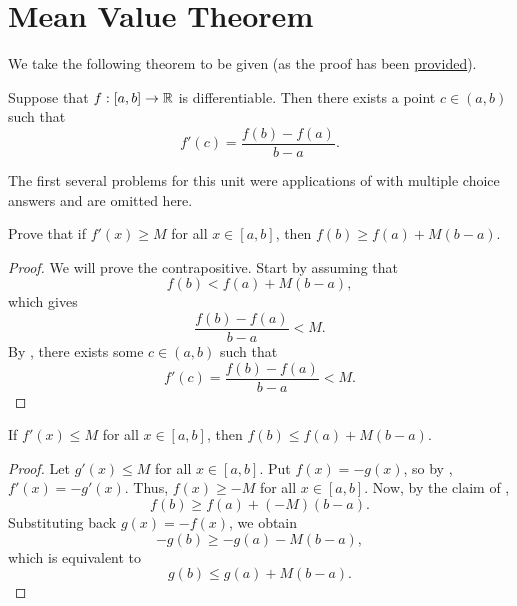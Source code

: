\section{Mean Value Theorem}

\begin{callout}
  We take the following theorem to be given (as the proof has been
  \href{https://www.youtube.com/watch?v=qtKZo1qOVlQ}{provided}).
  \begin{theorem}
  \label{thm:mean-value-theorem}
    Suppose that $f : [a, b] \to \mathbb{R}$ is differentiable. Then there exists a point $c \in (a, b)$ such that
    \[
      f'(c) = \frac{f(b) - f(a)}{b - a}.
    \]
  \end{theorem}
\end{callout}

\begin{callout}
  The first several problems for this unit were applications of
   with multiple choice answers and are omitted
  here.
\end{callout}

\begin{problem}
  \label{prob:lower-bounded-deriv-endpoints-not-on-secant-line}
  Prove that if $f'(x) \geq M$ for all $x \in [a, b]$, then $f(b) \geq f(a) + M(b - a)$.

  \begin{proof}
    We will prove the contrapositive. Start by assuming that
    \[
      f(b) < f(a) + M(b - a),
    \]
    which gives
    \[
      \frac{f(b) - f(a)}{b - a} < M.
    \]
    By , there exists some $c \in (a, b)$ such that
    \[
      f'(c) = \frac{f(b) - f(a)}{b - a} < M.
    \]
  \end{proof}

  \begin{corollary}
    \label{cor:upper-bounded-deriv-endpoints-not-on-secant-line}
    If $f'(x) \leq M$ for all $x \in [a, b]$, then $f(b) \leq f(a) + M(b - a)$.
  \end{corollary}

  \begin{proof}
    Let $g'(x) \leq M$ for all $x \in [a, b]$. Put $f(x) = -g(x)$, so by , $f'(x) = -g'(x)$.
    Thus, $f(x) \geq -M$ for all $x \in [a, b]$. Now, by the claim of ,
    \[
      f(b) \geq f(a) + (-M)(b - a).
    \]
    Substituting back $g(x) = -f(x)$, we obtain 
    \[ 
      -g(b) \geq -g(a) - M(b - a),
    \] 
    which is equivalent to
    \[
      g(b) \leq g(a) + M(b - a).
    \]
  \end{proof}

\end{problem}

